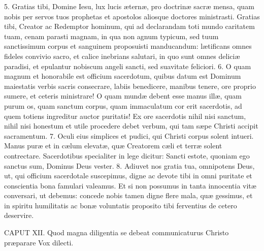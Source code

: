 \documentclass[twoside]{article}
\begin{document}
5. Gratias tibi, Domine Iesu, lux lucis æternæ, pro doctrinæ sacræ mensa, quam nobis per servos tuos prophetas et apostolos aliosque doctores ministrasti. Gratias tibi, Creator ac Redemptor hominum, qui ad declarandam toti mundo caritatem tuam, cenam parasti magnam, in qua non agnum typicum, sed tuum sanctissimum corpus et sanguinem proposuisti manducandum: lætificans omnes fideles convivio sacro, et calice inebrians salutari, in quo sunt omnes deliciæ paradisi, et epulantur nobiscum angeli sancti, sed suavitate feliciori.
6. O quam magnum et honorabile est officium sacerdotum, quibus datum est Dominum maiestatis verbis sacris consecrare, labiis benedicere, manibus tenere, ore proprio sumere, et ceteris ministrare! O quam mundæ debent esse manus illæ, quam purum os, quam sanctum corpus, quam immaculatum cor erit sacerdotis, ad quem totiens ingreditur auctor puritatis! Ex ore sacerdotis nihil nisi sanctum, nihil nisi honestum et utile procedere debet verbum, qui tam sæpe Christi accipit sacramentum.
7. Oculi eius simplices et pudici, qui Christi corpus solent intueri. Manus puræ et in cælum elevatæ, quæ Creatorem cæli et terræ solent contrectare. Sacerdotibus specialiter in lege dicitur: Sancti estote, quoniam ego sanctus sum, Dominus Deus vester.
8. Adiuvet nos gratia tua, omnipotens Deus, ut, qui officium sacerdotale suscepimus, digne ac devote tibi in omni puritate et conscientia bona famulari valeamus. Et si non possumus in tanta innocentia vitæ conversari, ut debemus: concede nobis tamen digne flere mala, quæ gessimus, et in spiritu humilitatis ac bonæ voluntatis proposito tibi ferventius de cetero deservire.


CAPUT XII.
Quod magna diligentia se debeat communicaturus Christo præparare
Vox dilecti.
\end{document}
